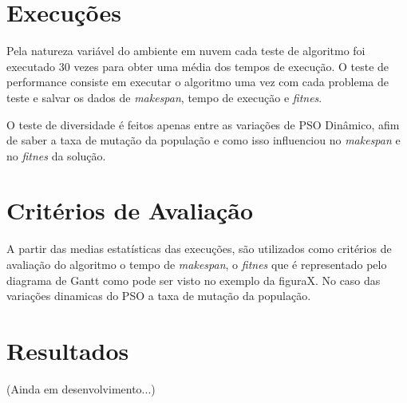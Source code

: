 


\section{Execuções}
    Pela natureza variável do ambiente em nuvem cada teste de algoritmo foi executado 30 vezes para obter uma média dos tempos de execução. O teste de performance consiste em executar o algoritmo uma vez com cada problema de teste e salvar os dados de \textit{makespan}, tempo de execução e \textit{fitnes}.

    O teste de diversidade é feitos apenas entre as variações de PSO Dinâmico, afim de saber a taxa de mutação da população e como isso influenciou no \textit{makespan} e no \textit{fitnes} da solução.



\section{Critérios de Avaliação}
    A partir das medias estatísticas das execuções, são utilizados como critérios de avaliação do algoritmo o tempo de \textit{makespan}, o \textit{fitnes} que é representado pelo diagrama de Gantt como pode ser visto no exemplo da figuraX. No caso das variações dinamicas do PSO a taxa de mutação da população.



\section{Resultados}
    (Ainda em desenvolvimento...)









